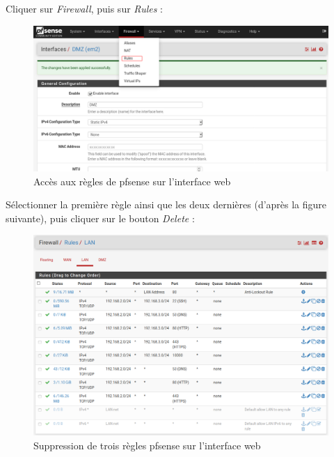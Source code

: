 Cliquer sur \textit{Firewall}, puis sur \textit{Rules} :
  \begin{figure}[h!]
     \begin{center}
         \includegraphics[scale=0.5]{Debian_screenshots/Config/13.png}
         \caption{Accès aux règles de pfsense sur l'interface web}
         \label{Debian_screenshots/Config/13}
     \end{center}
  \end{figure}
  \FloatBarrier

\pagebreak
Sélectionner la première règle ainsi que les deux dernières (d'après la figure suivante), puis cliquer sur le bouton \textit{Delete} :
  \begin{figure}[h!]
     \begin{center}
         \includegraphics[scale=0.5]{Debian_screenshots/Config/14.png}
         \caption{Suppression de trois règles pfsense sur l'interface web}
         \label{Debian_screenshots/Config/14}
     \end{center}
  \end{figure}
  \FloatBarrier
     
